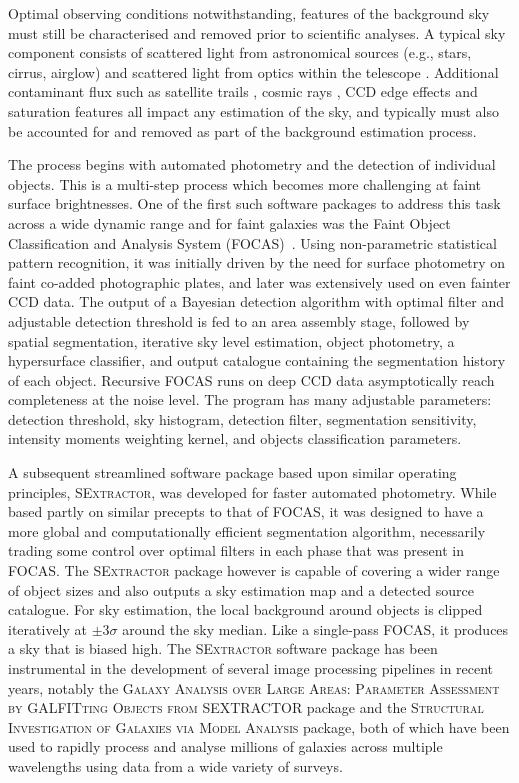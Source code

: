 \documentclass[fleqn,usenatbib,useAMS]{mnras}
\newcommand*{\SExtractor}{\textsc{SExtractor}\xspace}
\begin{document}
Optimal observing conditions notwithstanding, features of the background sky must still be characterised and removed prior to scientific analyses. A typical sky component consists of scattered light from astronomical sources (e.g., stars, cirrus, airglow) and scattered light from optics within the telescope \citep{Karabal2017}. Additional contaminant flux such as satellite trails \citep{Cheselka1999,Vandame2001,Storkey2004}, cosmic rays \citep{Fixsen2000}, CCD edge effects \citep{Goldstein2015} and saturation features \citep{Desai2016} all impact any estimation of the sky, and typically must also be accounted for and removed as part of the background estimation process. 

The process begins with automated photometry and the detection of individual objects. This is a multi-step process which becomes more challenging at faint surface brightnesses. One of the first such software packages to address this task across a wide dynamic range and for faint galaxies was the Faint Object Classification and Analysis System (\textsc{FOCAS})~\cite{Jarvis1981}. Using non-parametric statistical pattern recognition, it was initially driven by the need for surface photometry on faint co-added photographic plates, and later was extensively used on even fainter CCD data. The output of a Bayesian detection algorithm with optimal filter and adjustable detection threshold is fed to an area assembly stage, followed by spatial segmentation, iterative sky level estimation, object photometry, a hypersurface classifier, and output catalogue containing the segmentation history of each object. Recursive \textsc{FOCAS} runs on deep CCD data asymptotically reach completeness at the noise level. The program has many adjustable parameters: detection threshold, sky histogram, detection filter, segmentation sensitivity, intensity moments weighting kernel, and objects classification parameters. 

A subsequent streamlined software package based upon similar operating principles, \SExtractor \citep{Bertin1996}, was developed for faster automated photometry. While based partly on similar precepts to that of \textsc{FOCAS}, it was designed to have a more global and computationally efficient segmentation algorithm, necessarily trading some control over optimal filters in each phase that was present in \textsc{FOCAS}. The \SExtractor package however is capable of covering a wider range of object sizes and also outputs a sky estimation map and a detected source catalogue. For sky estimation, the local background around objects is clipped iteratively at $\pm3\sigma$ around the sky median. Like a single-pass FOCAS, it produces a sky that is biased high. The \SExtractor software package has been instrumental in the development of several image processing pipelines in recent years, notably the \textsc{Galaxy Analysis over Large Areas: Parameter Assessment by GALFITting Objects from SEXTRACTOR} \citep[\textsc{GALAPAGOS};][]{Barden2012,Hiemer2014} package and the \textsc{Structural Investigation of Galaxies via Model Analysis} \citep[\textsc{SIGMA};][]{Kelvin2010,Kelvin2012} package, both of which have been used to rapidly process and analyse millions of galaxies across multiple wavelengths using data from a wide variety of surveys.
\end{document}
